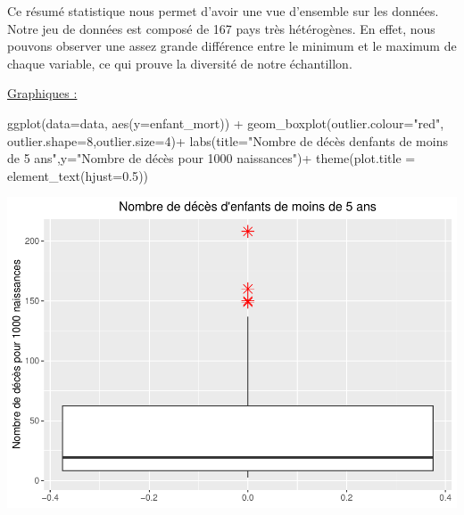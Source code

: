 \documentclass[
]{article}
\newenvironment{Shaded}{\begin{snugshade}}{\end{snugshade}}
\newcommand{\AttributeTok}[1]{\textcolor[rgb]{0.77,0.63,0.00}{#1}}
\newcommand{\DecValTok}[1]{\textcolor[rgb]{0.00,0.00,0.81}{#1}}
\newcommand{\FloatTok}[1]{\textcolor[rgb]{0.00,0.00,0.81}{#1}}
\newcommand{\FunctionTok}[1]{\textcolor[rgb]{0.00,0.00,0.00}{#1}}
\newcommand{\NormalTok}[1]{#1}
\newcommand{\SpecialCharTok}[1]{\textcolor[rgb]{0.00,0.00,0.00}{#1}}
\newcommand{\StringTok}[1]{\textcolor[rgb]{0.31,0.60,0.02}{#1}}
\begin{document}
Ce résumé statistique nous permet d'avoir une vue d'ensemble sur les
données.\\
Notre jeu de données est composé de 167 pays très hétérogènes. En effet,
nous pouvons observer une assez grande différence entre le minimum et le
maximum de chaque variable, ce qui prouve la diversité de notre
échantillon.

\uline{Graphiques :}

\begin{Shaded}
\begin{Highlighting}[]
\FunctionTok{ggplot}\NormalTok{(}\AttributeTok{data=}\NormalTok{data, }\FunctionTok{aes}\NormalTok{(}\AttributeTok{y=}\NormalTok{enfant\_mort)) }\SpecialCharTok{+} 
  \FunctionTok{geom\_boxplot}\NormalTok{(}\AttributeTok{outlier.colour=}\StringTok{"red"}\NormalTok{, }\AttributeTok{outlier.shape=}\DecValTok{8}\NormalTok{,}\AttributeTok{outlier.size=}\DecValTok{4}\NormalTok{)}\SpecialCharTok{+}
  \FunctionTok{labs}\NormalTok{(}\AttributeTok{title=}\StringTok{"Nombre de décès d\textquotesingle{}enfants de moins de 5 ans"}\NormalTok{,}\AttributeTok{y=}\StringTok{"Nombre de décès pour 1000 naissances"}\NormalTok{)}\SpecialCharTok{+}
  \FunctionTok{theme}\NormalTok{(}\AttributeTok{plot.title =} \FunctionTok{element\_text}\NormalTok{(}\AttributeTok{hjust=}\FloatTok{0.5}\NormalTok{))}
\end{Highlighting}
\end{Shaded}

\includegraphics{projet_apprentissage_non_supp_files/figure-latex/unnamed-chunk-5-1.pdf}
\end{document}

